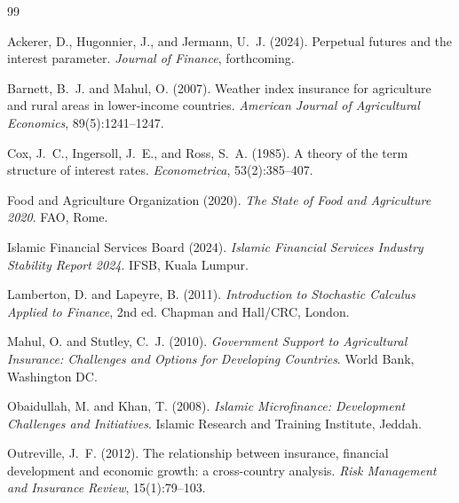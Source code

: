 \documentclass[12pt,a4paper]{article}
\begin{document}
\newpage

\begin{thebibliography}{99}

Ackerer, D., Hugonnier, J., and Jermann, U.~J. (2024).
\newblock Perpetual futures and the interest parameter.
\newblock \textit{Journal of Finance}, forthcoming.

Barnett, B.~J. and Mahul, O. (2007).
\newblock Weather index insurance for agriculture and rural areas in lower-income countries.
\newblock \textit{American Journal of Agricultural Economics}, 89(5):1241--1247.

Cox, J.~C., Ingersoll, J.~E., and Ross, S.~A. (1985).
\newblock A theory of the term structure of interest rates.
\newblock \textit{Econometrica}, 53(2):385--407.

Food and Agriculture Organization (2020).
\newblock \textit{The State of Food and Agriculture 2020}.
\newblock FAO, Rome.

Islamic Financial Services Board (2024).
\newblock \textit{Islamic Financial Services Industry Stability Report 2024}.
\newblock IFSB, Kuala Lumpur.

Lamberton, D. and Lapeyre, B. (2011).
\newblock \textit{Introduction to Stochastic Calculus Applied to Finance}, 2nd ed.
\newblock Chapman and Hall/CRC, London.

Mahul, O. and Stutley, C.~J. (2010).
\newblock \textit{Government Support to Agricultural Insurance: Challenges and Options for Developing Countries}.
\newblock World Bank, Washington DC.

Obaidullah, M. and Khan, T. (2008).
\newblock \textit{Islamic Microfinance: Development Challenges and Initiatives}.
\newblock Islamic Research and Training Institute, Jeddah.

Outreville, J.~F. (2012).
\newblock The relationship between insurance, financial development and economic growth: a cross-country analysis.
\newblock \textit{Risk Management and Insurance Review}, 15(1):79--103.


\end{thebibliography}
\end{document}
